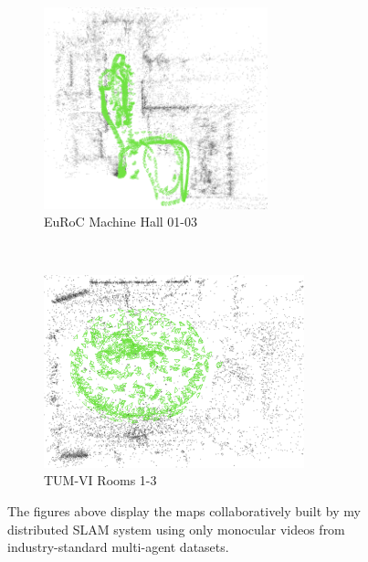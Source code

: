 \begin{figure}[h]
    \centering
    \captionsetup{format=plain, labelformat=empty}
    \begin{subfigure}[t]{0.475\linewidth}
        \centering
        \includegraphics[height=2.3in]{figures/euroc_mh_map.png}
        \caption{EuRoC Machine Hall 01-03}
    \end{subfigure}\hfill%
    ~
    \begin{subfigure}[t]{0.475\linewidth}
        \centering
        \includegraphics[height=2.2in]{figures/tum_room_map.png}
        \caption{TUM-VI Rooms 1-3}
    \end{subfigure}

    \caption{The figures above display the maps collaboratively built by my distributed SLAM system using only monocular videos from industry-standard multi-agent datasets.}
    \label{fig:example-maps}
\end{figure}
